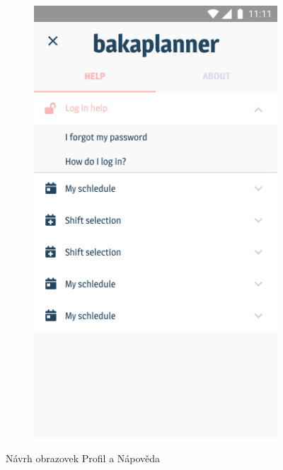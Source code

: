 \documentclass[twoside]{ctuthesis}
\begin{document}
\begin{figure}[h]
\begin{subfigure}[h!]{.5\textwidth}
		\includegraphics[width=.9\linewidth]{img/v1-help_interface.png}
		\label{fig:v1-shift-button}
	\end{subfigure}
	\caption{Návrh obrazovek Profil a Nápověda}
\end{figure}

\newpage
\end{document}
